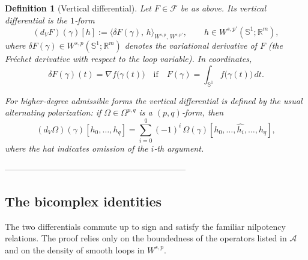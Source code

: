 \documentclass{amsart}
\newcounter{thm}
\newcounter{ex}
\newcounter{re}
\newtheorem{definition}[thm]{Definition}
\begin{document}
\begin{definition}[Vertical differential]\label{def:dV}
Let $F\in\mathcal F$ be as above.  Its vertical differential is the $1$‑form
\[
(d_{V}F)(\gamma)[h]
   :=\big\langle\delta F(\gamma),\,h\big\rangle_{W^{s,p},\,W^{s,p'}},
   \qquad h\in W^{s,p'}(\mathbb S^{1};\mathbb R^{m}),
\]
where $\delta F(\gamma)\in W^{s,p}(\mathbb S^{1};\mathbb R^{m})$ denotes the
variational derivative of $F$ (the Fréchet derivative with respect to the loop
variable).  In coordinates,
\[
\delta F(\gamma)(t)=\nabla f\bigl(\gamma(t)\bigr)
\quad\text{if}\quad
F(\gamma)=\int_{\mathbb S^{1}}f\bigl(\gamma(t)\bigr)\,dt .
\]

For higher‑degree admissible forms the vertical differential is defined by the
usual alternating polarization:
if $\Omega\in\Omega^{p,q}$ is a $(p,q)$‑form, then
\[
(d_{V}\Omega)(\gamma)[h_{0},\dots,h_{q}]
   =\sum_{i=0}^{q}(-1)^{i}\,
     \Omega(\gamma)[h_{0},\dots,\widehat{h_{i}},\dots,h_{q}],
\]
where the hat indicates omission of the $i$‑th argument.
\end{definition}

-----------------------------------------------------------------
\subsection{The bicomplex identities}
\label{subsec:bicomplex-identities}
The two differentials commute up to sign and satisfy the familiar nilpotency
relations.  The proof relies only on the boundedness of the operators listed in
$\mathcal A$ and on the density of smooth loops in $W^{s,p}$.
\end{document}
